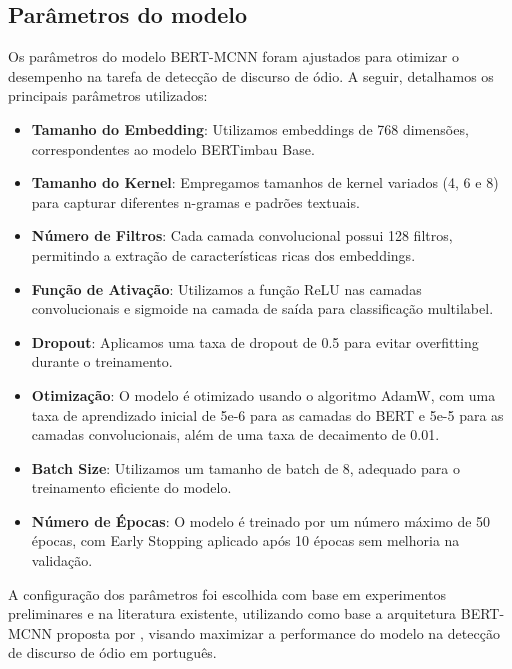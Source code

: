 \documentclass[sigconf,nonacm]{acmart}
\begin{document}
\subsection{{Parâmetros} do modelo}
Os parâmetros do modelo BERT-MCNN foram ajustados para otimizar o desempenho na tarefa de detecção de discurso de ódio. A seguir, detalhamos os principais parâmetros utilizados:

\begin{itemize}
  \item \textbf{Tamanho do Embedding}: Utilizamos embeddings de 768 dimensões, correspondentes ao modelo BERTimbau Base.
  \item \textbf{Tamanho do Kernel}: Empregamos tamanhos de kernel variados (4, 6 e 8) para capturar diferentes n-gramas e padrões textuais.
  \item \textbf{Número de Filtros}: Cada camada convolucional possui 128 filtros, permitindo a extração de características ricas dos embeddings.
  \item \textbf{Função de Ativação}: Utilizamos a função ReLU nas camadas convolucionais e sigmoide na camada de saída para classificação multilabel.
  \item \textbf{Dropout}: Aplicamos uma taxa de dropout de 0.5 para evitar overfitting durante o treinamento.
  \item \textbf{Otimização}: O modelo é otimizado usando o algoritmo AdamW, com uma taxa de aprendizado inicial de 5e-6 para as camadas do BERT e 5e-5 para as camadas convolucionais, além de uma taxa de decaimento de 0.01.
  \item \textbf{Batch Size}: Utilizamos um tamanho de batch de 8, adequado para o treinamento eficiente do modelo.
  \item \textbf{Número de Épocas}: O modelo é treinado por um número máximo de 50 épocas, com Early Stopping aplicado após 10 épocas sem melhoria na validação.
\end{itemize}

A configuração dos parâmetros foi escolhida com base em experimentos preliminares e na literatura existente, utilizando como base a arquitetura BERT-MCNN proposta por \cite{ATANDOH2023101578}, visando maximizar a performance do modelo na detecção de discurso de ódio em português.
\end{document}
